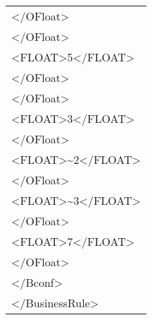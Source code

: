\begin{center}
\begin{tabular}{|p{11cm}|}
\textless /OFloat\textgreater \\
\textless /OFloat\textgreater \\
\textless FLOAT\textgreater 5\textless /FLOAT\textgreater \\
\textless /OFloat\textgreater \\
\textless /OFloat\textgreater \\
\textless FLOAT\textgreater 3\textless /FLOAT\textgreater \\
\textless /OFloat\textgreater \\
\textless FLOAT\textgreater \textasciitilde2\textless /FLOAT\textgreater \\
\textless /OFloat\textgreater \\
\textless FLOAT\textgreater \textasciitilde3\textless /FLOAT\textgreater \\
\textless /OFloat\textgreater \\
\textless FLOAT\textgreater 7\textless /FLOAT\textgreater \\
\textless /OFloat\textgreater \\
\textless /Bconf\textgreater \\
\textless /BusinessRule\textgreater \\
 \hline
\end{tabular} \\
\end{center}

